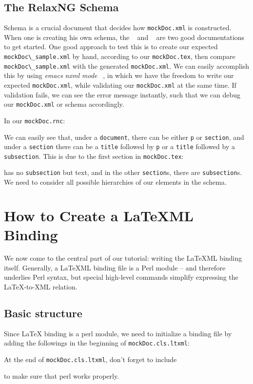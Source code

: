 \documentclass[a4paper]{article}
\def\latexml{{\LaTeX}ML\xspace}
\begin{document}
\subsection{The RelaxNG Schema}\label{sec:rnc}
Schema is a crucial document that decides how \lstinline|mockDoc.xml| is constructed. When
one is creating his own schema, the ~\cite{RelaxNG:tutorial} and ~\cite{XML:tutorial} are two
good documentations to get started. One good approach to test this is to create our
expected \lstinline|mockDoc\_sample.xml| by hand, according to our
\lstinline|mockDoc.tex|, then compare \lstinline|mockDoc\_sample.xml| with the generated
\lstinline|mockDoc.xml|. We can easily accomplish this by using \textit{emacs nxml
  mode} ~\cite{Emacs:nxml}, in which we have the freedom to write
our expected \lstinline|mockDoc.xml|, while validating our \lstinline|mockDoc.xml| at
the same time. If validation fails, we can see the error message instantly, such that we
can debug our \lstinline|mockDoc.xml| or schema accordingly.

In our \lstinline|mockDoc.rnc|:

We can easily see that, under a \lstinline|document|, there can be either \lstinline|p| or \lstinline|section|, and under a \lstinline|section| there can be a \lstinline|title| followed by \lstinline|p| or a \lstinline|title| followed by a \lstinline|subsection|. This is due to the first section in \lstinline|mockDoc.tex|:

has no \lstinline|subsection| but text, and in the other \lstinline|section|s, there are \lstinline|subsection|s. We need to consider all possible hierarchies of our elements in the schema.



\section{How to Create a \latexml Binding}\label{sec:bind}
We now come to the central part of our tutorial: writing the \latexml binding
itself. Generally, a \latexml binding file is a Perl module -- and therefore underlies
Perl syntax, but special high-level commands simplify expressing the {\LaTeX}-to-XML
relation.

\subsection{Basic structure}
Since {\LaTeX} binding is a perl module, we need to initialize a binding file by adding
the followings in the beginning of \lstinline|mockDoc.cls.ltxml|:

At the end of \lstinline|mockDoc.cls.ltxml|, don't forget to include

to make sure that perl works properly.
\end{document}
